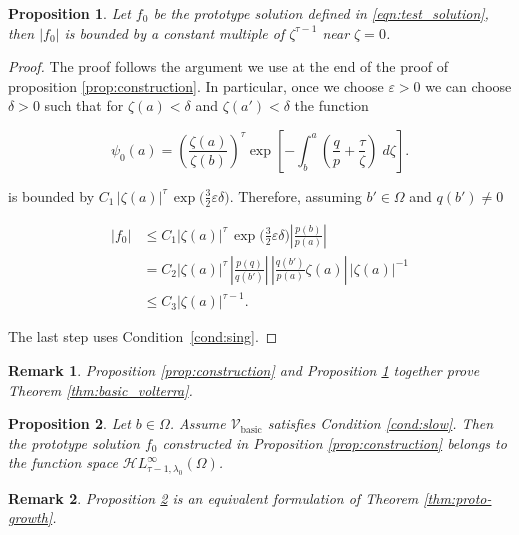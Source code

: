 \documentclass{article}
\theoremstyle{plain}
\newtheorem{prop}{Proposition}
\newtheorem{rmk}{Remark}
\newcommand{\singexp}[2]{\mathcal{H}L^\infty_{#1, #2}}
\newcommand{\hardpart}{\mathcal{V}_\text{basic}}
\newcommand{\domain}{\Omega}
\begin{document}
\begin{prop}\label{prop:asymptotic at zero}
    Let $f_0$ be the prototype solution defined in \eqref{eqn:test_solution}, then $|f_0|$ is bounded by a constant multiple of $\zeta^{\tau-1}$ near $\zeta=0$. 
\end{prop}

\begin{proof}
The proof follows the argument we use at the end of the proof of proposition \ref{prop:construction}. In particular, once we choose $\varepsilon>0$ we can choose $\delta>0$ such that for $\zeta(a)<\delta$ and $\zeta(a')<\delta$ the function

\[ \psi_0(a) = \left(\frac{\zeta(a)}{\zeta(b)}\right)^\tau \exp\left[-\int_b^a \left( \frac{q}{p} + \frac{\tau}{\zeta} \right)\;d\zeta\right]. \]

is bounded by $C_1 \, |\zeta(a)|^\tau \, \exp\big(\tfrac{3}{2}\varepsilon\delta\big)$. Therefore, assuming $b'\in\Omega$ and $q(b') \neq 0$

\begin{align*}
|f_0| &  \leq C_1 |\zeta(a)|^\tau \, \exp\big(\tfrac{3}{2}\varepsilon\delta\big) \left\vert  \frac{p(b)}{p(a)}\right\vert \\
& =  C_2 |\zeta(a)|^\tau \, \left\vert\frac{p(q)}{q(b')} \right\vert \, \left\vert \frac{q(b')}{p(a)} \zeta(a)\right\vert \, |\zeta(a)|^{-1} \\
&  \leq C_3 |\zeta(a)|^{\tau-1}.
\end{align*}

The last step uses Condition~\eqref{cond:sing}. 
\end{proof}

\begin{rmk}
   {\em Proposition \ref{prop:construction}} and {\em Proposition \ref{prop:asymptotic at zero}} together prove {\em Theorem \ref{thm:basic_volterra}}. 
\end{rmk}


\begin{prop}\label{prop:asymptotic at infinity}
    Let $b\in\domain$. Assume $\hardpart$ satisfies {\em Condition} \eqref{cond:slow}. Then the prototype solution $f_0$ constructed in {\em Proposition \ref{prop:construction}} belongs to the function space $\singexp{\tau-1}{\lambda_0}(\domain)$.
\end{prop}

\begin{rmk}
    {\em Proposition \ref{prop:asymptotic at infinity}} is an equivalent formulation of {\em Theorem \ref{thm:proto-growth}}.
\end{rmk}
\end{document}

